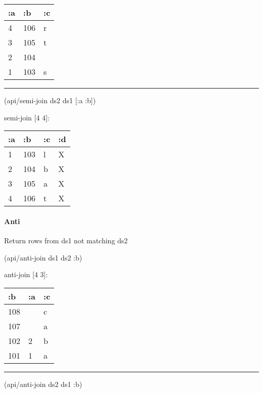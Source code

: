 \documentclass[]{article}
\newenvironment{Shaded}{\begin{snugshade}}{\end{snugshade}}
\newcommand{\AttributeTok}[1]{\textcolor[rgb]{0.77,0.63,0.00}{#1}}
\newcommand{\NormalTok}[1]{#1}
\let\oldparagraph\paragraph
\renewcommand{\paragraph}[1]{\oldparagraph{#1}\mbox{}}
\begin{document}
\begin{longtable}[]{@{}lll@{}}
\toprule
:a & :b & :c\tabularnewline
\midrule
\endhead
4 & 106 & r\tabularnewline
3 & 105 & t\tabularnewline
2 & 104 &\tabularnewline
1 & 103 & s\tabularnewline
\bottomrule
\end{longtable}

\begin{center}\rule{0.5\linewidth}{0.5pt}\end{center}

\begin{Shaded}
\begin{Highlighting}[]
\NormalTok{(api/semi-join ds2 ds1 [}\AttributeTok{:a} \AttributeTok{:b}\NormalTok{])}
\end{Highlighting}
\end{Shaded}

semi-join {[}4 4{]}:

\begin{longtable}[]{@{}llll@{}}
\toprule
:a & :b & :c & :d\tabularnewline
\midrule
\endhead
1 & 103 & l & X\tabularnewline
2 & 104 & b & X\tabularnewline
3 & 105 & a & X\tabularnewline
4 & 106 & t & X\tabularnewline
\bottomrule
\end{longtable}

\paragraph{Anti}\label{anti}

Return rows from ds1 not matching ds2

\begin{Shaded}
\begin{Highlighting}[]
\NormalTok{(api/anti-join ds1 ds2 }\AttributeTok{:b}\NormalTok{)}
\end{Highlighting}
\end{Shaded}

anti-join {[}4 3{]}:

\begin{longtable}[]{@{}lll@{}}
\toprule
:b & :a & :c\tabularnewline
\midrule
\endhead
108 & & c\tabularnewline
107 & & a\tabularnewline
102 & 2 & b\tabularnewline
101 & 1 & a\tabularnewline
\bottomrule
\end{longtable}

\begin{center}\rule{0.5\linewidth}{0.5pt}\end{center}

\begin{Shaded}
\begin{Highlighting}[]
\NormalTok{(api/anti-join ds2 ds1 }\AttributeTok{:b}\NormalTok{)}
\end{Highlighting}
\end{Shaded}
\end{document}
